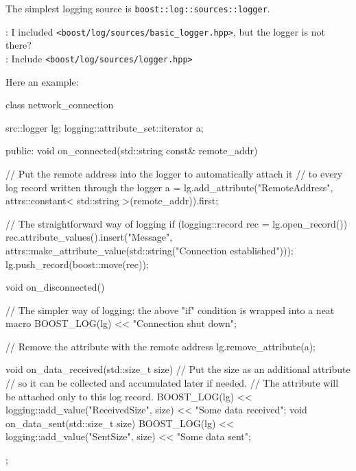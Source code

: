 \documentclass[dvipsnames]{article}
\begin{document}
The simplest logging source is \texttt{boost::log::sources::logger}.
\begin{tcolorbox}
   : I included \texttt{<boost/log/sources/basic\_logger.hpp>}, but
  the logger is not there?\\
   : Include \texttt{<boost/log/sources/logger.hpp>}
\end{tcolorbox}
Here an example:
\begin{simplec}
  class network_connection{
  src::logger lg;
  logging::attribute_set::iterator a;

public:
  void on_connected(std::string const& remote_addr){
    // Put the remote address into the logger to automatically attach it
    // to every log record written through the logger
    a = lg.add_attribute("RemoteAddress",
                                           attrs::constant< std::string >(remote_addr)).first;

    // The straightforward way of logging
    if (logging::record rec = lg.open_record()){
        rec.attribute_values().insert("Message",
                                      attrs::make_attribute_value(std::string("Connection established")));
        lg.push_record(boost::move(rec));
      }
  }
  void on_disconnected(){
    // The simpler way of logging: the above "if" condition is wrapped into a neat macro
    BOOST_LOG(lg) << "Connection shut down";

    // Remove the attribute with the remote address
    lg.remove_attribute(a);
  }
  void on_data_received(std::size_t size){
    // Put the size as an additional attribute
    // so it can be collected and accumulated later if needed.
    // The attribute will be attached only to this log record.
    BOOST_LOG(lg) << logging::add_value("ReceivedSize", size) << "Some data received";
  }
  void on_data_sent(std::size_t size){
    BOOST_LOG(lg) << logging::add_value("SentSize", size) << "Some data sent";
  }
};
\end{simplec}
\end{document}
